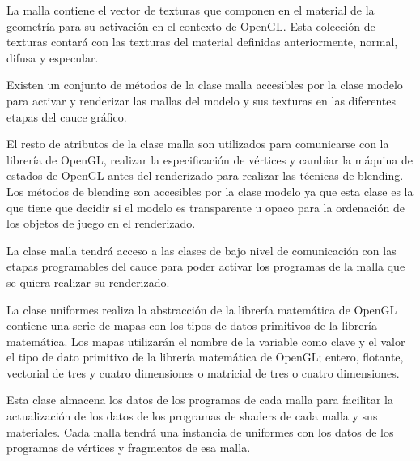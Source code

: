 \documentclass[a4paper, 17pt]{book}
\begin{document}
\vspace{1mm} %

La malla contiene el vector de texturas que componen en el material de la geometría para su activación en el contexto de OpenGL.
Esta colección de texturas contará con las texturas del material definidas anteriormente, normal, difusa y especular.

\vspace{1mm} %

Existen un conjunto de métodos de la clase malla accesibles por la clase modelo para activar y renderizar las mallas del modelo
y sus texturas en las diferentes etapas del cauce gráfico.

\vspace{1mm} %

El resto de atributos de la clase malla son utilizados para comunicarse con la librería de OpenGL, realizar la especificación de
vértices y cambiar la máquina de estados de OpenGL antes del renderizado para realizar las técnicas de blending. Los métodos de
blending son accesibles por la clase modelo ya que esta clase es la que tiene que decidir si el modelo es transparente u opaco
para la ordenación de los objetos de juego en el renderizado. 

\vspace{1mm} %

La clase malla tendrá acceso a las clases de bajo nivel de comunicación con las etapas programables del cauce para poder activar
los programas de la malla que se quiera realizar su renderizado.

\vspace{1mm} %

La clase uniformes realiza la abstracción de la librería matemática de OpenGL contiene una serie de mapas con los tipos de datos
primitivos de la librería matemática. Los mapas utilizarán el nombre de la variable como clave y el valor el tipo de dato primitivo
de la librería matemática de OpenGL; entero, flotante, vectorial de tres y cuatro dimensiones o matricial de tres o cuatro dimensiones. 

\vspace{1mm} %

Esta clase almacena los datos de los programas de cada malla para facilitar la actualización de los datos de los programas de
shaders de cada malla y sus materiales. Cada malla tendrá una instancia de uniformes con los datos de los programas de vértices
y fragmentos de esa malla.
\end{document}
